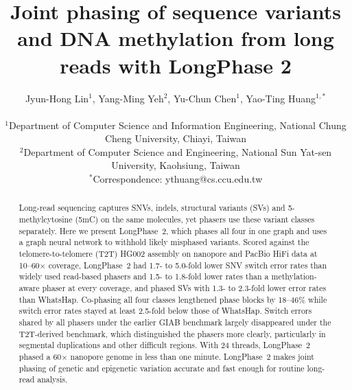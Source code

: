 \documentclass[11pt,a4paper]{article}
\title{Joint phasing of sequence variants and DNA methylation from long reads with LongPhase 2}
\author{%
Jyun-Hong Lin$^{1}$, Yang-Ming Yeh$^{2}$, Yu-Chun Chen$^{1}$, Yao-Ting Huang$^{1,\ast}$\\[4pt]
\parbox{0.95\textwidth}{\centering\small
$^{1}$Department of Computer Science and Information Engineering, National Chung Cheng University, Chiayi, Taiwan\\
$^{2}$Department of Computer Science and Engineering, National Sun Yat-sen University, Kaohsiung, Taiwan\\
$^{\ast}$Correspondence: ythuang@cs.ccu.edu.tw}
}
\date{}
\newcommand{\toolname}{LongPhase~2\xspace}       %
\begin{document}
\sloppy
\onehalfspacing
\linenumbers
\maketitle

\begin{abstract}
Long-read sequencing captures SNVs, indels, structural variants (SVs) and 5-methylcytosine (5mC) on the same molecules, yet phasers use these variant classes separately. Here we present \toolname, which phases all four in one graph and uses a graph neural network to withhold likely misphased variants. Scored against the telomere-to-telomere (T2T) HG002 assembly on nanopore and PacBio HiFi data at 10--60$\times$ coverage, \toolname had 1.7- to 5.0-fold lower SNV switch error rates than widely used read-based phasers and 1.5- to 1.8-fold lower rates than a methylation-aware phaser at every coverage, and phased SVs with 1.3- to 2.3-fold lower error rates than WhatsHap. Co-phasing all four classes lengthened phase blocks by 18--46\% while switch error rates stayed at least 2.5-fold below those of WhatsHap. Switch errors shared by all phasers under the earlier GIAB benchmark largely disappeared under the T2T-derived benchmark, which distinguished the phasers more clearly, particularly in segmental duplications and other difficult regions. With 24 threads, \toolname phased a 60$\times$ nanopore genome in less than one minute. \toolname makes joint phasing of genetic and epigenetic variation accurate and fast enough for routine long-read analysis.
\end{abstract}
\end{document}

